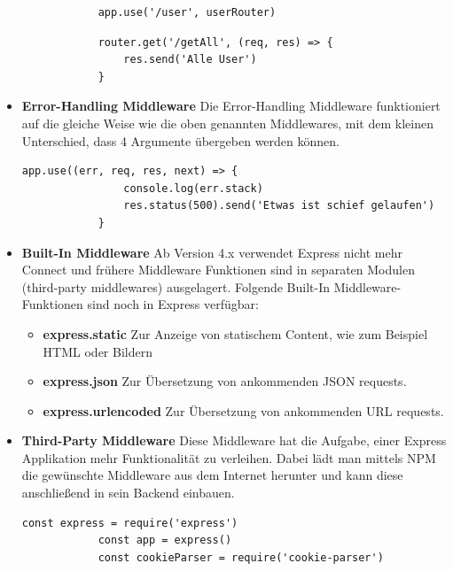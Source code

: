 \begin{itemize}
\begin{lstlisting}
            app.use('/user', userRouter)
        \end{lstlisting}

        \begin{lstlisting}
            router.get('/getAll', (req, res) => {
                res.send('Alle User')
            }
        \end{lstlisting}
    \item \textbf{Error-Handling Middleware}
        \newline
        Die Error-Handling Middleware funktioniert auf die gleiche Weise wie die oben genannten Middlewares, mit dem kleinen Unterschied, dass 4 Argumente übergeben werden können.
        \begin{lstlisting}[caption=Error-Handling Middleware]
            app.use((err, req, res, next) => {
                console.log(err.stack)
                res.status(500).send('Etwas ist schief gelaufen')
            }
        \end{lstlisting}
    \item \textbf{Built-In Middleware}
        \newline
        Ab Version 4.x verwendet Express nicht mehr Connect und frühere Middleware Funktionen sind in separaten Modulen (third-party middlewares) ausgelagert. Folgende Built-In Middleware-Funktionen sind noch in Express verfügbar:
        \begin{itemize}
            \item \textbf{express.static}
                \newline
                Zur Anzeige von statischem Content, wie zum Beispiel HTML oder Bildern
            \item \textbf{express.json}
                \newline
                Zur Übersetzung von ankommenden JSON requests.
            \item \textbf{express.urlencoded}
                \newline
                Zur Übersetzung von ankommenden URL requests.
        \end{itemize}
    \item \textbf{Third-Party Middleware}
        \newline
        Diese Middleware hat die Aufgabe, einer Express Applikation mehr Funktionalität zu verleihen. Dabei lädt man mittels NPM die gewünschte Middleware aus dem Internet herunter und kann diese anschließend in sein Backend einbauen.
        \begin{lstlisting}[caption=Third-Party Middleware]
            const express = require('express')
            const app = express()
            const cookieParser = require('cookie-parser')


\end{lstlisting}
\end{itemize}
